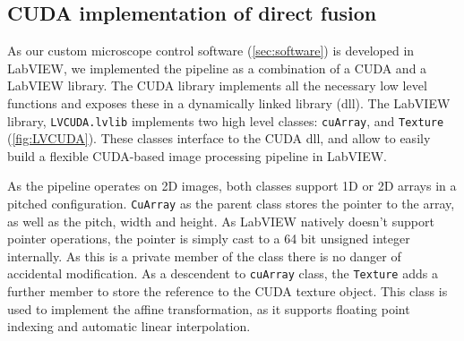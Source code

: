 
\subsection{CUDA implementation of direct fusion}
  As our custom microscope control software (\autoref{sec:software}) is developed in LabVIEW, we implemented the pipeline as a combination of a CUDA and a LabVIEW library. The CUDA library implements all the necessary low level functions and exposes these in a dynamically linked library (dll). The LabVIEW library, \texttt{LVCUDA.lvlib} implements two high level classes: \texttt{cuArray}, and \texttt{Texture} (\autoref{fig:LVCUDA}). These classes interface to the CUDA dll, and allow to easily build a flexible CUDA-based image processing pipeline in LabVIEW.

  As the pipeline operates on 2D images, both classes support 1D or 2D arrays in a pitched configuration. \texttt{CuArray} as the parent class stores the pointer to the array, as well as the pitch, width and height. As LabVIEW natively doesn't support pointer operations, the pointer is simply cast to a 64 bit unsigned integer internally. As this is a private member of the class there is no danger of accidental modification. As a descendent to \texttt{cuArray} class, the \texttt{Texture} adds a further member to store the reference to the CUDA texture object. This class is used to implement the affine transformation, as it supports floating point indexing and automatic linear interpolation.

